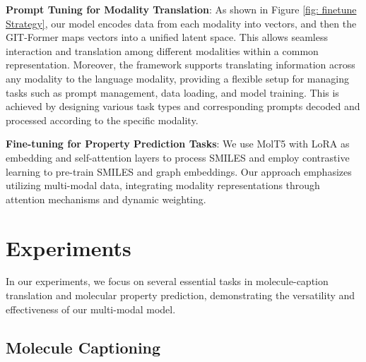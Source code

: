 \documentclass{article}
\begin{document}
\textbf{Prompt Tuning for Modality Translation}: As shown in Figure \ref{fig: finetune Strategy}, our model encodes data from each modality into vectors, and then the GIT-Former maps vectors into a unified latent space. This allows seamless interaction and translation among different modalities within a common representation. Moreover, the framework supports translating information across any modality to the language modality, providing a flexible setup for managing tasks such as prompt management, data loading, and model training. This is achieved by designing various task types and corresponding prompts decoded and processed according to the specific modality.

\textbf{Fine-tuning for Property Prediction Tasks}: We use MolT5 with LoRA as embedding and self-attention layers to process SMILES and employ contrastive learning to pre-train SMILES and graph embeddings. Our approach emphasizes utilizing multi-modal data, integrating modality representations through attention mechanisms and dynamic weighting.


\section{Experiments}
\label{sec:eva}
In our experiments, we focus on several essential tasks in molecule-caption translation and molecular property prediction, demonstrating the versatility and effectiveness of our multi-modal model.


\subsection{Molecule Captioning}
\end{document}
